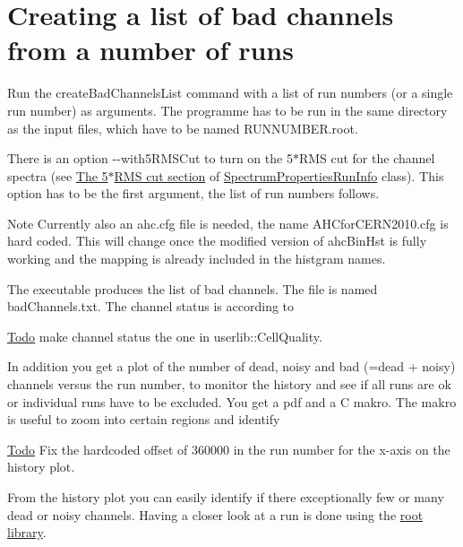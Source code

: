 \hypertarget{createbadchannelslist_exe_ListGeneration}{}\section{Creating a list of bad channels from a number of runs}\label{createbadchannelslist_exe_ListGeneration}
Run the {\ttfamily createBadChannelsList} command with a list of run numbers (or a single run number) as arguments. The programme has to be run in the same directory as the input files, which have to be named RUNNUMBER.root.

There is an option {\ttfamily -\/-\/with5RMSCut} to turn on the 5$\ast$RMS cut for the channel spectra (see \hyperlink{class_spectrum_properties_run_info_FiveRMSCut}{The 5$\ast$RMS cut section} of \hyperlink{class_spectrum_properties_run_info}{SpectrumPropertiesRunInfo} class). This option has to be the first argument, the list of run numbers follows.

\begin{DoxyNote}{Note}
Currently also an ahc.cfg file is needed, the name AHCforCERN2010.cfg is hard coded. This will change once the modified version of ahcBinHst is fully working and the mapping is already included in the histgram names.
\end{DoxyNote}
The executable produces the list of bad channels. The file is named {\ttfamily badChannels.txt}. The channel status is according to \begin{Desc}
\item[\hyperlink{todo__todo000005}{Todo}]make channel status the one in userlib::CellQuality.\end{Desc}
In addition you get a plot of the number of dead, noisy and bad (=dead + noisy) channels versus the run number, to monitor the history and see if all runs are ok or individual runs have to be excluded. You get a pdf and a C makro. The makro is useful to zoom into certain regions and identify \begin{Desc}
\item[\hyperlink{todo__todo000006}{Todo}]Fix the hardcoded offset of 360000 in the run number for the x-\/axis on the history plot.\end{Desc}
From the history plot you can easily identify if there exceptionally few or many dead or noisy channels. Having a closer look at a run is done using the \hyperlink{rootlib}{root library}. 
